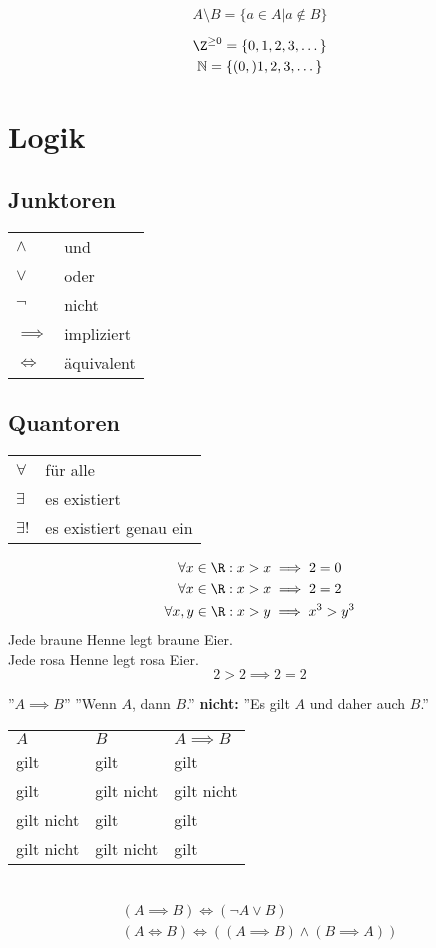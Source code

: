 \[ A \setminus B = \{ a \in A | a \notin B \} \]

\begin{gather*}
	\Z^{\geq 0} = \{0, 1, 2, 3, \dotsc \} \\
	\N = \{ (0,) 1, 2, 3, \dotsc \}
\end{gather*}

\section{Logik}
\subsection{Junktoren}
\begin{tabular}{ll}
	$\wedge$	&und			\\
	$\vee$	&oder		\\
	$\neg$	&nicht		\\
	$\implies$	&impliziert		\\
	$\iff$	&äquivalent	
\end{tabular}

\subsection{Quantoren}
\begin{tabular}{ll}
	$\forall$	&für alle				\\
	$\exists$	&es existiert			\\
	$\exists!$	&es existiert genau ein	
\end{tabular}

\begin{bsp*}
	\begin{gather*}
		\forall x \in \R : x > x \implies 2 = 0 \\
		\forall x \in \R : x > x \implies 2 = 2 \\
		\forall x, y \in \R : x > y \implies x^3 > y^3 \\
	\end{gather*}
	Jede braune Henne legt braune Eier.\\
	Jede rosa Henne legt rosa Eier.\\
	\[ 2 > 2 \implies 2 =2 \]
\end{bsp*}

''$A \implies B$'' \qquad ''Wenn $A$, dann $B$.'' \qquad \textbf{nicht:} ''Es gilt $A$ und daher auch $B$.''\\
\begin{tabular}{lll}
	$A$		&$B$		&$A \implies B$	\\
	gilt		&gilt		&gilt			\\
	gilt		&gilt nicht	&gilt nicht		\\
	gilt nicht	&gilt		&gilt			\\
	gilt nicht	&gilt nicht	&gilt			
\end{tabular}\\
\begin{gather*}
	(A \implies B) \iff (\neg A \vee B) \\
	(A \iff B) \iff ((A \implies B) \wedge (B \implies A))
\end{gather*}

